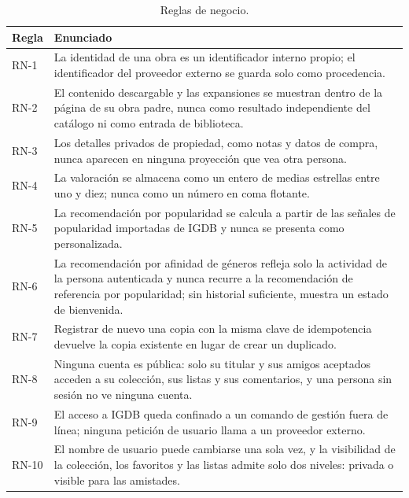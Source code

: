 \begin{table}[H]
\centering
\begin{tabularx}{\textwidth}{ | C{0.12\textwidth} | Y | }
    \hline
    \textbf{Regla} & \textbf{Enunciado} \\
    \hline
    RN-1 & La identidad de una obra es un identificador interno propio; el identificador del proveedor externo se guarda solo como procedencia. \\
    \hline
    RN-2 & El contenido descargable y las expansiones se muestran dentro de la página de su obra padre, nunca como resultado independiente del catálogo ni como entrada de biblioteca. \\
    \hline
    RN-3 & Los detalles privados de propiedad, como notas y datos de compra, nunca aparecen en ninguna proyección que vea otra persona. \\
    \hline
    RN-4 & La valoración se almacena como un entero de medias estrellas entre uno y diez; nunca como un número en coma flotante. \\
    \hline
    RN-5 & La recomendación por popularidad se calcula a partir de las señales de popularidad importadas de IGDB y nunca se presenta como personalizada. \\
    \hline
    RN-6 & La recomendación por afinidad de géneros refleja solo la actividad de la persona autenticada y nunca recurre a la recomendación de referencia por popularidad; sin historial suficiente, muestra un estado de bienvenida. \\
    \hline
    RN-7 & Registrar de nuevo una copia con la misma clave de idempotencia devuelve la copia existente en lugar de crear un duplicado. \\
    \hline
    RN-8 & Ninguna cuenta es pública: solo su titular y sus amigos aceptados acceden a su colección, sus listas y sus comentarios, y una persona sin sesión no ve ninguna cuenta. \\
    \hline
    RN-9 & El acceso a IGDB queda confinado a un comando de gestión fuera de línea; ninguna petición de usuario llama a un proveedor externo. \\
    \hline
    RN-10 & El nombre de usuario puede cambiarse una sola vez, y la visibilidad de la colección, los favoritos y las listas admite solo dos niveles: privada o visible para las amistades. \\
    \hline
\end{tabularx}
\caption{Reglas de negocio.}
\label{tab:reglas-negocio}
\end{table}

